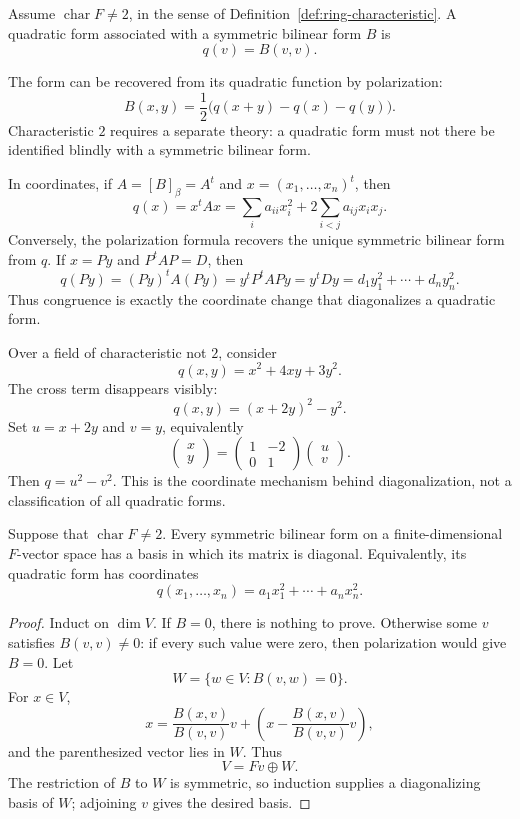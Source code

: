 \begin{definition}
Assume \(\operatorname{char}F\ne2\), in the sense of
Definition~\ref{def:ring-characteristic}. A quadratic form associated with a
symmetric bilinear form \(B\) is
\[
q(v)=B(v,v).
\]
\end{definition}

The form can be recovered from its quadratic function by polarization:
\[
B(x,y)
=\frac12\bigl(q(x+y)-q(x)-q(y)\bigr).
\]
Characteristic \(2\) requires a separate theory: a quadratic form must not
there be identified blindly with a symmetric bilinear form.

In coordinates, if \(A=[B]_\beta=A^t\) and
\(x=(x_1,\ldots,x_n)^t\), then
\[
q(x)=x^tAx
=\sum_i a_{ii}x_i^2+2\sum_{i<j}a_{ij}x_ix_j.
\]
Conversely, the polarization formula recovers the unique symmetric bilinear
form from \(q\).  If \(x=Py\) and \(P^tAP=D\), then
\[
q(Py)=(Py)^tA(Py)=y^tP^tAPy=y^tDy
=d_1y_1^2+\cdots+d_ny_n^2.
\]
Thus congruence is exactly the coordinate change that diagonalizes a
quadratic form.

\begin{example}
Over a field of characteristic not \(2\), consider
\[
q(x,y)=x^2+4xy+3y^2.
\]
The cross term disappears visibly:
\[
q(x,y)=(x+2y)^2-y^2.
\]
Set \(u=x+2y\) and \(v=y\), equivalently
\[
\begin{pmatrix}x\\y\end{pmatrix}
=\begin{pmatrix}1&-2\\0&1\end{pmatrix}
\begin{pmatrix}u\\v\end{pmatrix}.
\]
Then \(q=u^2-v^2\).  This is the coordinate mechanism behind diagonalization,
not a classification of all quadratic forms.
\end{example}

\begin{theorem}
Suppose that \(\operatorname{char}F\ne2\).  Every symmetric bilinear form on
a finite-dimensional \(F\)-vector space has a basis in which its matrix is
diagonal.  Equivalently, its quadratic form has coordinates
\[
q(x_1,\ldots,x_n)=a_1x_1^2+\cdots+a_nx_n^2.
\]
\end{theorem}
\begin{proof}
Induct on \(\dim V\).  If \(B=0\), there is nothing to prove.  Otherwise
some \(v\) satisfies \(B(v,v)\ne0\): if every such value were zero, then
polarization would give \(B=0\).  Let
\[
W=\{w\in V:B(v,w)=0\}.
\]
For \(x\in V\),
\[
x=\frac{B(x,v)}{B(v,v)}v+
\left(x-\frac{B(x,v)}{B(v,v)}v\right),
\]
and the parenthesized vector lies in \(W\).  Thus
\[
V=Fv\oplus W.
\]
The restriction of \(B\) to \(W\) is symmetric, so induction supplies a
diagonalizing basis of \(W\); adjoining \(v\) gives the desired basis.
\end{proof}

